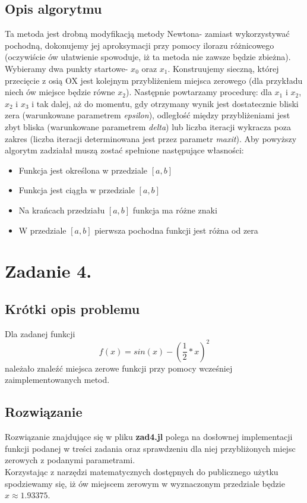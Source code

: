 \documentclass[a4paper,14pt]{report}
\begin{document}
  \section{Opis algorytmu}
  Ta metoda jest drobną modyfikacją metody Newtona- zamiast wykorzystywać pochodną, dokonujemy jej aproksymacji przy pomocy ilorazu różnicowego (oczywiście ów ułatwienie spowoduje, iż ta metoda nie zawsze będzie zbieżna).
  Wybieramy dwa punkty startowe- $x_{0}$ oraz $x_{1}$. Konstruujemy sieczną, której przecięcie z osią OX jest kolejnym przybliżeniem miejsca zerowego (dla przykładu niech ów miejsce będzie równe $x_{2}$). Następnie powtarzamy procedurę: dla $x_{1}$ i $x_{2}$, $x_{2}$ i $x_{3}$ i tak dalej, aż do momentu, gdy otrzymany wynik jest dostatecznie bliski zera (warunkowane parametrem \textit{epsilon}), odległość między przybliżeniami jest zbyt bliska (warunkowane parametrem \textit{delta}) lub liczba iteracji wykracza poza zakres (liczba iteracji determinowana jest przez parametr \textit{maxit}).
  Aby powyższy algorytm zadziałał muszą zostać spełnione następujące własności:
  \begin{itemize}
    \item Funkcja jest określona w przedziale $[a,b]$
    \item Funkcja jest ciągła w przedziale $[a,b]$
    \item Na krańcach przedziału $[a,b]$ funkcja ma różne znaki
    \item W przedziale $[a,b]$ pierwsza pochodna funkcji jest różna od zera
  \end{itemize}

\chapter{Zadanie 4.}
  \section{Krótki opis problemu}
  Dla zadanej funkcji
  \begin{equation}
    f(x)=sin(x)-(\frac{1}{2}*x)^{2}
  \end{equation}
  należało znaleźć miejsca zerowe funkcji przy pomocy wcześniej zaimplementowanych metod.
  \section{Rozwiązanie}
  Rozwiązanie znajdujące się w pliku \textbf{zad4.jl} polega na dosłownej implementacji funkcji podanej w treści zadania oraz sprawdzeniu dla niej przybliżonych miejsc zerowych z podanymi parametrami.\\
  Korzystając z narzędzi matematycznych dostępnych do publicznego użytku spodziewamy się, iż ów miejscem zerowym w wyznaczonym przedziale będzie $x\approx 1.93375$.
\end{document}
